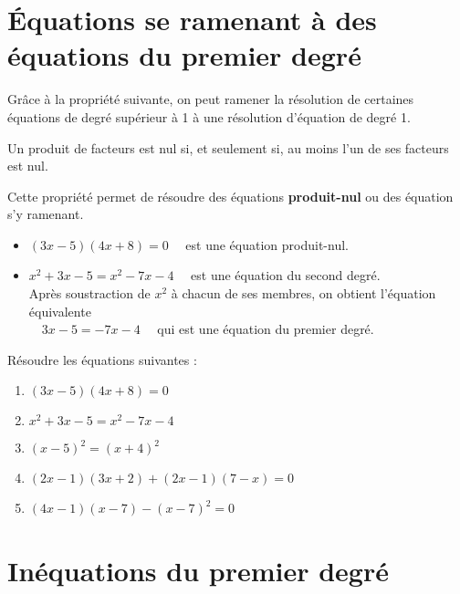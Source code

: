 \documentclass[a4paper,11pt,cours]{nsi}
\begin{document}
\section{\'Equations se ramenant à des équations du premier degré}

Grâce à la propriété suivante, on peut ramener la résolution de certaines équations de degré supérieur à 1 à une résolution d'équation de degré 1.

\begin{propriete}[]
	Un produit de facteurs est nul si, et seulement si, au moins l'un de ses facteurs est nul.
\end{propriete}

Cette propriété permet de résoudre des équations \textbf{produit-nul} ou des équation s'y ramenant.

\begin{exemple}[s]
	\begin{itemize}
		\item 	$(3x-5)(4x+8)=0 \quad$ est une équation produit-nul.
		\item	$x^2+3x-5=x^2-7x-4 \quad$ est une équation du second degré.\\
		Après soustraction de $x^2$ à chacun de ses membres, on obtient l'équation équivalente \\$\quad 3x-5=-7x-4 \quad$ qui est une équation du premier degré.
	\end{itemize}
\end{exemple}

\begin{exercice}[]
	Résoudre les équations suivantes :
	\begin{multicols}{2}
		\begin{enumerate}
			\item 	$(3x-5)(4x+8)=0$
			\item 	$x^2+3x-5=x^2-7x-4$
			\item	$(x-5)^2=(x+4)^2$
			\item	$(2x-1)(3x+2)+(2x-1)(7-x)=0$
			\item	$(4x-1)(x-7)-(x-7)^2=0$\\
				
		\end{enumerate}
	\end{multicols}
\end{exercice}

\section{Inéquations du premier degré}
\end{document}
